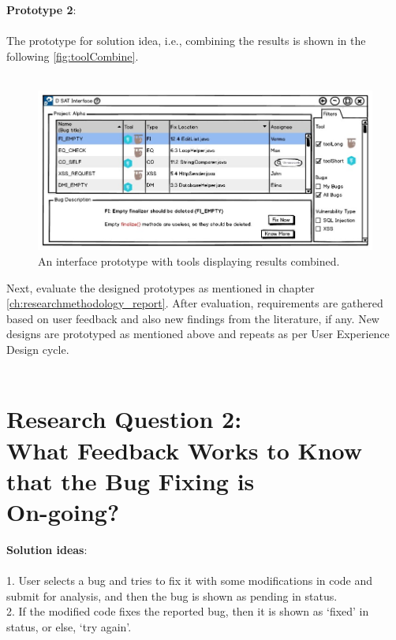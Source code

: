 \clearpage

\textbf{Prototype 2}: \\ \\

The prototype for solution idea, i.e., combining the results is shown in the following \autoref{fig:toolCombine}. \\ \\

\begin{figure}[hbt!]
	\centering
	\includegraphics[width=\linewidth]{figures/d_combine}
	\caption{An interface prototype with tools displaying results combined.}
	\label{fig:toolCombine}
\end{figure}

Next, evaluate the designed prototypes as mentioned in chapter \ref{ch:researchmethodology_report}. After evaluation, requirements are gathered based on user feedback and also new findings from the literature, if any. New designs are prototyped as mentioned above and repeats as per User Experience Design cycle. \\ \\

\section{Research Question 2: \\ What Feedback Works to Know that the Bug Fixing is	\\ On-going?}

\textbf{Solution ideas}: \\ \\


1. User selects a bug and tries to fix it with some modifications in code and submit for analysis, and then the bug is shown as pending in status. \\
2. If the modified code fixes the reported bug, then it is shown as ‘fixed’ in status, or else, ‘try again’. \\ \\

